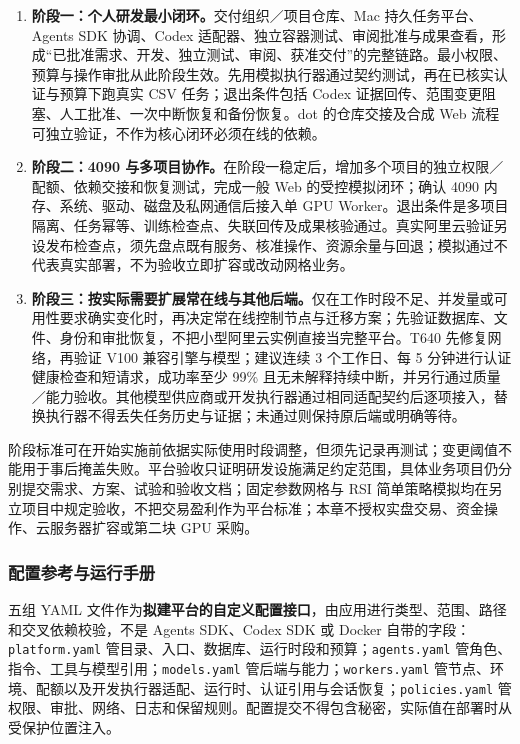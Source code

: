 \documentclass[11pt,a4paper]{article}
\begin{document}
\begin{enumerate}[leftmargin=2em,itemsep=4pt]
  \item \textbf{阶段一：个人研发最小闭环。}交付组织／项目仓库、Mac 持久任务平台、Agents SDK 协调、Codex 适配器、独立容器测试、审阅批准与成果查看，形成“已批准需求、开发、独立测试、审阅、获准交付”的完整链路。最小权限、预算与操作审批从此阶段生效。先用模拟执行器通过契约测试，再在已核实认证与预算下跑真实 CSV 任务；退出条件包括 Codex 证据回传、范围变更阻塞、人工批准、一次中断恢复和备份恢复。dot 的仓库交接及合成 Web 流程可独立验证，不作为核心闭环必须在线的依赖。
  \item \textbf{阶段二：4090 与多项目协作。}在阶段一稳定后，增加多个项目的独立权限／配额、依赖交接和恢复测试，完成一般 Web 的受控模拟闭环；确认 4090 内存、系统、驱动、磁盘及私网通信后接入单 GPU Worker。退出条件是多项目隔离、任务幂等、训练检查点、失联回传及成果核验通过。真实阿里云验证另设发布检查点，须先盘点既有服务、核准操作、资源余量与回退；模拟通过不代表真实部署，不为验收立即扩容或改动网格业务。
  \item \textbf{阶段三：按实际需要扩展常在线与其他后端。}仅在工作时段不足、并发量或可用性要求确实变化时，再决定常在线控制节点与迁移方案；先验证数据库、文件、身份和审批恢复，不把小型阿里云实例直接当完整平台。T640 先修复网络，再验证 V100 兼容引擎与模型；建议连续 3 个工作日、每 5 分钟进行认证健康检查和短请求，成功率至少 99\% 且无未解释持续中断，并另行通过质量／能力验收。其他模型供应商或开发执行器通过相同适配契约后逐项接入，替换执行器不得丢失任务历史与证据；未通过则保持原后端或明确等待。
\end{enumerate}

阶段标准可在开始实施前依据实际使用时段调整，但须先记录再测试；变更阈值不能用于事后掩盖失败。平台验收只证明研发设施满足约定范围，具体业务项目仍分别提交需求、方案、试验和验收文档；固定参数网格与 RSI 简单策略模拟均在另立项目中规定验收，不把交易盈利作为平台标准；本章不授权实盘交易、资金操作、云服务器扩容或第二块 GPU 采购。

\subsubsection{配置参考与运行手册}

五组 YAML 文件作为\textbf{拟建平台的自定义配置接口}，由应用进行类型、范围、路径和交叉依赖校验，不是 Agents SDK、Codex SDK 或 Docker 自带的字段：\texttt{platform.yaml} 管目录、入口、数据库、运行时段和预算；\texttt{agents.yaml} 管角色、指令、工具与模型引用；\texttt{models.yaml} 管后端与能力；\texttt{workers.yaml} 管节点、环境、配额以及开发执行器适配、运行时、认证引用与会话恢复；\texttt{policies.yaml} 管权限、审批、网络、日志和保留规则。配置提交不得包含秘密，实际值在部署时从受保护位置注入。
\end{document}
